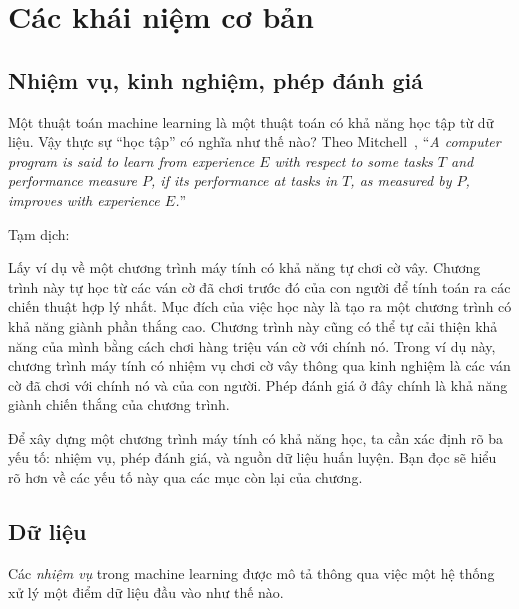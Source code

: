 
\chapter{Các khái niệm cơ bản}


\section{Nhiệm vụ, kinh nghiệm, phép đánh giá}
Một thuật toán machine learning là một thuật toán có khả năng {học tập} từ dữ
liệu. Vậy thực sự ``học tập'' có nghĩa như thế nào? Theo
Mitchell~\cite{mitchell1997machine}, ``\textit{A computer program is said to learn from
\textit{experience} $E$ with respect to some \textit{tasks} $T$ and
\textit{performance measure} $P$, if its performance at tasks in $T$, as
measured by $P$, improves with experience $E$.}''

Tạm dịch:


Lấy ví dụ về một chương trình máy tính có khả năng tự chơi cờ vây. Chương trình này tự học từ các ván cờ đã chơi trước đó của con người để tính toán ra các chiến thuật hợp lý nhất. Mục đích của việc học này là tạo ra một chương trình có khả năng giành phần thắng cao. Chương trình này cũng có thể tự cải thiện khả năng của mình bằng cách chơi hàng triệu ván cờ với chính nó. Trong ví dụ này, chương trình máy tính có nhiệm vụ chơi cờ vây thông qua kinh nghiệm là {các ván cờ đã chơi} với chính nó và của con người. Phép đánh giá ở đây chính là khả năng giành chiến thắng của chương trình.

Để xây dựng một chương trình máy tính có khả năng học, ta cần xác định rõ ba yếu tố: nhiệm vụ, phép đánh giá, và nguồn dữ liệu huấn luyện. Bạn đọc sẽ hiểu rõ hơn về các yếu tố này qua các mục còn lại của chương.

\section{Dữ liệu}
Các \textit{nhiệm vụ} trong machine learning được mô tả thông qua việc
một hệ thống xử lý một điểm dữ liệu đầu vào như thế nào.

